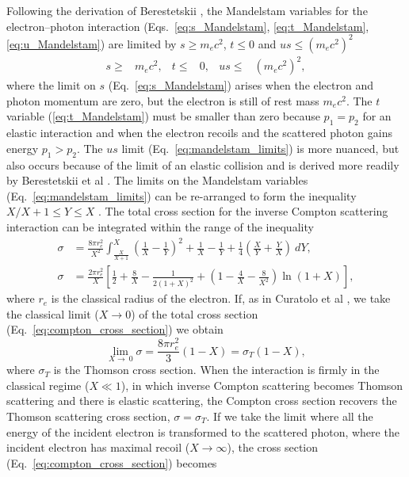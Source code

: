 \documentclass[../main.tex]{subfiles}
\begin{document}
Following the derivation of Berestetskii \cite{berestetskii1982quantum}, the Mandelstam variables for the electron--photon interaction (Eqs.~\ref{eq:s_Mandelstam}, \ref{eq:t_Mandelstam}, \ref{eq:u_Mandelstam}) are limited by $s\geq m_{e}c^{2}$, $t \leq 0$ and $u s \leq \left(m_{e}c^{2}\right)^{2}$
\begin{align}
s\geq& m_{e}c^{2}, & t \leq& 0, & us \leq& \left(m_{e}c^{2}\right)^{2},   \label{eq:mandelstam_limits} 
\end{align}
where the limit on $s$ (Eq.~\ref{eq:s_Mandelstam}) arises when the electron and photon momentum are zero, but the electron is still of rest mass $m_{e}c^{2}$. The $t$ variable (\ref{eq:t_Mandelstam}) must be smaller than zero because $p_{1}=p_{2}$ for an elastic interaction and when the electron recoils and the scattered photon gains energy $p_{1}>p_{2}$. The $us$ limit (Eq.~\ref{eq:mandelstam_limits}) is more nuanced, but also occurs because of the limit of an elastic collision and is derived more readily by Berestetskii et al \cite{berestetskii1982quantum}. The limits on the Mandelstam variables (Eq.~\ref{eq:mandelstam_limits}) can be re-arranged to form the inequality $X/X+1 \leq Y \leq X$ \cite{sun2009characterizations}. The total cross section for the inverse Compton scattering interaction \cite{berestetskii1982quantum} can be integrated within the range of the inequality
\begin{align}
\sigma &= \frac{8\pi r_{e}^{2}}{X^{2}}\int_{\frac{X}{X+1}}^{X}\left(\frac{1}{X}-\frac{1}{Y}\right)^{2}+\frac{1}{X}-\frac{1}{Y}+\frac{1}{4}\left(\frac{X}{Y}+\frac{Y}{X}\right)~dY, \nonumber \\
\sigma &= \frac{2\pi r_{e}^{2}}{X}\left[\frac{1}{2}+\frac{8}{X}-\frac{1}{2\left(1+X\right)^{2}}+\left(1-\frac{4}{X}-\frac{8}{X^{2}}\right)\ln{\left(1+X\right)}\right],
\label{eq:compton_cross_section}
\end{align}
where $r_{e}$ is the classical radius of the electron. If, as in Curatolo et al \cite{curatolo2017analytical}, we take the classical limit ($X \to 0$) of the total cross section (Eq.~\ref{eq:compton_cross_section}) we obtain
\begin{equation}
\lim_{X \to ~0} \sigma = \frac{8\pi r_{e}^{2}}{3}\left(1-X\right) = \sigma_{T}\left(1-X\right),
\label{eq:compton_cross_section_classical_limit}
\end{equation}
where $\sigma_{T}$ is the Thomson cross section. When the interaction is firmly in the classical regime ($X \ll 1$), in which inverse Compton scattering becomes Thomson scattering and there is elastic scattering, the Compton cross section recovers the Thomson scattering cross section, $\sigma = \sigma_{T}$. If we take the limit where all the energy of the incident electron is transformed to the scattered photon, where the incident electron has maximal recoil ($X \to \infty$), the cross section (Eq.~\ref{eq:compton_cross_section}) becomes
\end{document}

